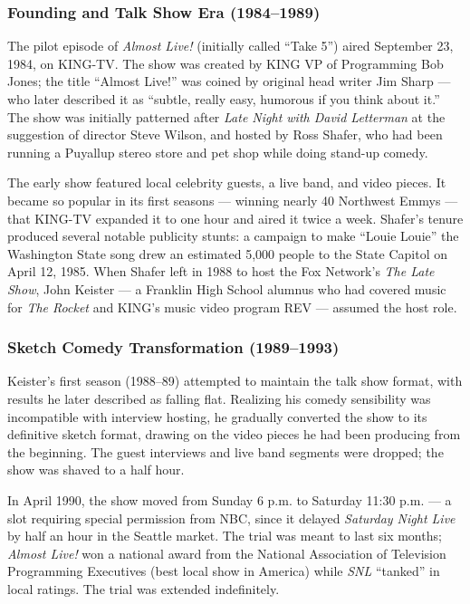 \documentclass[11pt,letterpaper]{article}
\begin{document}
\subsubsection{Founding and Talk Show Era (1984--1989)}

The pilot episode of \textit{Almost Live!} (initially called ``Take 5'') aired September 23, 1984, on KING-TV. The show was created by KING VP of Programming Bob Jones; the title ``Almost Live!'' was coined by original head writer Jim Sharp --- who later described it as ``subtle, really easy, humorous if you think about it.'' The show was initially patterned after \textit{Late Night with David Letterman} at the suggestion of director Steve Wilson, and hosted by Ross Shafer, who had been running a Puyallup stereo store and pet shop while doing stand-up comedy.

The early show featured local celebrity guests, a live band, and video pieces. It became so popular in its first seasons --- winning nearly 40 Northwest Emmys --- that KING-TV expanded it to one hour and aired it twice a week. Shafer's tenure produced several notable publicity stunts: a campaign to make ``Louie Louie'' the Washington State song drew an estimated 5,000 people to the State Capitol on April 12, 1985. When Shafer left in 1988 to host the Fox Network's \textit{The Late Show}, John Keister --- a Franklin High School alumnus who had covered music for \textit{The Rocket} and KING's music video program REV --- assumed the host role.

\subsubsection{Sketch Comedy Transformation (1989--1993)}

Keister's first season (1988--89) attempted to maintain the talk show format, with results he later described as falling flat. Realizing his comedy sensibility was incompatible with interview hosting, he gradually converted the show to its definitive sketch format, drawing on the video pieces he had been producing from the beginning. The guest interviews and live band segments were dropped; the show was shaved to a half hour.

In April 1990, the show moved from Sunday 6 p.m. to Saturday 11:30 p.m. --- a slot requiring special permission from NBC, since it delayed \textit{Saturday Night Live} by half an hour in the Seattle market. The trial was meant to last six months; \textit{Almost Live!} won a national award from the National Association of Television Programming Executives (best local show in America) while \textit{SNL} ``tanked'' in local ratings. The trial was extended indefinitely.
\end{document}
